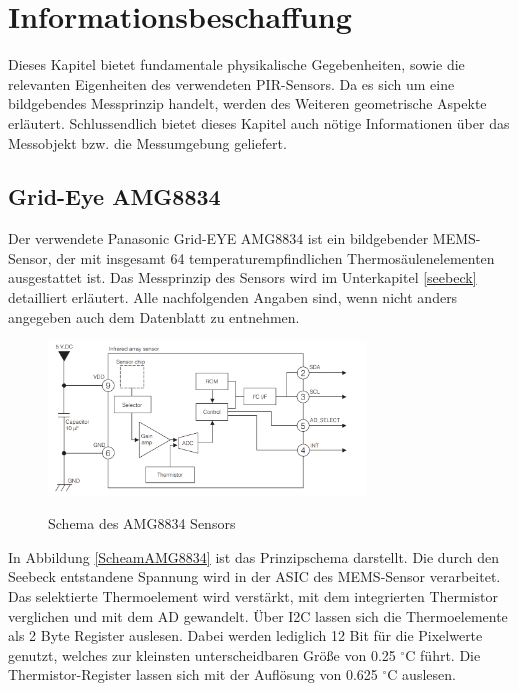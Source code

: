 \chapter{Informationsbeschaffung}
\label{chap:Informationsbeschaffung}
Dieses Kapitel bietet fundamentale physikalische Gegebenheiten, sowie die relevanten Eigenheiten des verwendeten  \ac{PIR}-Sensors. Da es sich um eine bildgebendes Messprinzip handelt, werden des Weiteren geometrische Aspekte erläutert. Schlussendlich bietet dieses Kapitel auch nötige Informationen über das Messobjekt bzw. die Messumgebung geliefert.

\section{Grid-Eye AMG8834}

Der verwendete Panasonic Grid-EYE AMG8834 ist ein bildgebender \ac{MEMS}-Sensor, der mit insgesamt 64 temperaturempfindlichen Thermosäulenelementen ausgestattet ist. Das Messprinzip des Sensors wird im Unterkapitel \ref{seebeck} detailliert erläutert. Alle nachfolgenden Angaben sind, wenn nicht anders angegeben auch dem Datenblatt zu entnehmen.

\begin{figure}[H]
	\centering
	\includegraphics[width=0.75\textwidth]
	{fig/Circuit_AMG8834.PNG}
	\caption[Schema des AMG8834 Sensors]{Schema des AMG8834 Sensors} \protect\cite{AMG8834}
	\label{fig:SchemaAMG8834}
\end{figure}


In Abbildung \ref{ScheamAMG8834} ist das Prinzipschema darstellt. Die durch den Seebeck entstandene Spannung wird in der \ac{ASIC} des \ac{MEMS}-Sensor verarbeitet. Das selektierte Thermoelement wird verstärkt, mit dem integrierten Thermistor verglichen und mit dem \ac{AD} gewandelt. Über \ac{I2C} lassen sich die Thermoelemente als 2 Byte Register auslesen. 
Dabei werden lediglich 12 Bit für die Pixelwerte genutzt, welches zur kleinsten unterscheidbaren Größe von 0.25 $^\circ$C führt. Die Thermistor-Register lassen sich mit der Auflösung von 0.625 $^\circ$C auslesen.

